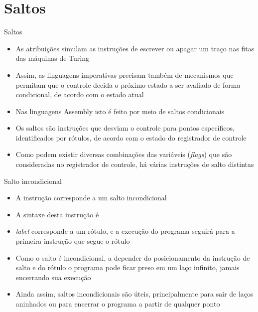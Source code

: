 \section{Saltos}

\begin{frame}[fragile]{Saltos}

    \begin{itemize}
        \item As atribuições simulam as instruções de escrever ou apagar um traço nas fitas das
            máquinas de Turing

        \item Assim, as linguagens imperativas precisam também de mecanismos que permitam que o
            controle decida o próximo estado a ser avaliado de forma condicional, de acordo com o
            estado atual

        \item Nas linguagens Assembly isto é feito por meio de saltos condicionais

        \item Os saltos são instruções que desviam o controle para pontos específicos, 
            identificados por rótulos, de acordo com o estado do registrador de controle

        \item Como podem existir diversas combinações das variáveis (\textit{flags}) que são
            consideradas no registrador de controle, há várias instruções de salto distintas
    \end{itemize}

\end{frame}

\begin{frame}[fragile]{Salto incondicional}

    \begin{itemize}
        \item A instrução  corresponde a um salto incondicional

        \item A sintaxe desta instrução é


        \item \textit{label} corresponde a um rótulo, e a execução do programa seguirá para a
            primeira instrução que segue o rótulo

        \item Como o salto é incondicional, a depender do posicionamento da instrução de salto e
            do rótulo o programa pode ficar preso em um laço infinito, jamais encerrando sua
            execução

        \item Ainda assim, saltos incondicionais são úteis, principalmente para sair de laços 
            aninhados ou para encerrar o programa a partir de qualquer ponto
    \end{itemize}

\end{frame}

